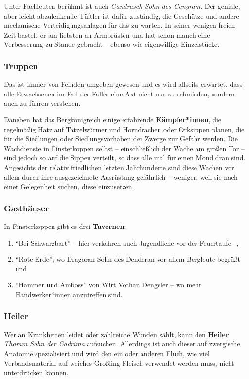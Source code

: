 Unter Fachleuten berühmt ist auch \emph{Gandrasch Sohn des Gengram}. Der geniale, aber leicht abzulenkende Tüftler ist dafür zuständig, die Geschütze und andere mechanische Verteidigungsanlagen für das \fkv zu warten.
In seiner wenigen freien Zeit bastelt er am liebsten an Armbrüsten und hat schon manch eine Verbesserung zu Stande gebracht -- ebenso wie eigenwillige Einzelstücke.


\subsubsection{Truppen}

Das \fkv ist immer von Feinden umgeben gewesen und es wird allseits erwartet, dass alle Erwachsenen im Fall des Falles eine Axt nicht nur zu schmieden, sondern auch zu führen verstehen.

Daneben hat das Bergkönigreich einige erfahrende \textbf{Kämpfer*innen}, die regelmäßig Hatz auf Tatzelwürmer und Horndrachen oder Orksippen planen,
die für die Siedlungen oder Siedlungsvorhaben der Zwerge zur Gefahr werden.
Die Wachdienste in Finsterkoppen selbst -- einschließlich der Wache am großen Tor -- sind jedoch so auf die Sippen verteilt,
so dass alle mal für einen Mond dran sind.
Angesichts der relativ friedlichen letzten Jahrhunderte sind diese Wachen vor allem durch ihre ausgezeichnete Ausrüstung gefährlich -- weniger, weil sie nach einer Gelegenheit suchen, diese einzusetzen.

\subsubsection{Gasthäuser}
In Finsterkoppen gibt es drei \textbf{Tavernen}: 
\begin{enumerate}
\item \enquote{Bei Schwarzbart} -- hier verkehren auch Jugendliche vor der Feuertaufe --,
\item \enquote{Rote Erde}, wo Dragoran Sohn des Denderan vor allem Bergleute begrüßt und \item \enquote{Hammer und Amboss} von Wirt Vothan Dengeler -- wo mehr Handwerker*innen anzutreffen sind.
\end{enumerate}

\subsubsection{Heiler}
Wer an Krankheiten leidet oder zahlreiche Wunden zählt, kann den \textbf{Heiler} \emph{Thoram Sohn der Cadrima} aufsuchen.
Allerdings ist auch dieser auf zwergische Anatomie spezialisiert und wird den ein oder anderen Fluch, wie viel Verbandsmaterial auf weiches Großling-Fleisch verwendet werden muss, nicht unterdrücken können.

